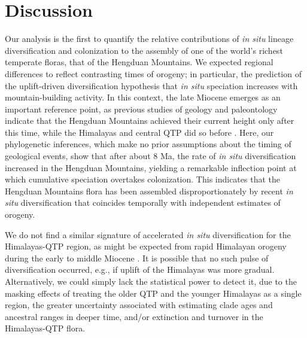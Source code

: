 \documentclass[9pt,twocolumn,twoside,lineno]{pnas-new}
\begin{document}
\section*{Discussion}

Our analysis is the first to quantify the relative contributions of
\textit{in situ} lineage diversification and colonization to the
assembly of one of the world's richest temperate floras, that of the
Hengduan Mountains. We expected regional differences to reflect
contrasting times of orogeny; in particular, the prediction of the
uplift-driven diversification hypothesis that \textit{in situ}
speciation increases with mountain-building activity. In this context,
the late Miocene emerges as an important reference point, as previous
studies of geology and paleontology indicate that the Hengduan
Mountains achieved their current height only after this time, while
the Himalayas and central QTP did so before
\citep{WangY2012,Wang2014,Spicer2003,Favre2015,Renner2016}. Here, our
phylogenetic inferences, which make no prior assumptions about the
timing of geological events, show that after about 8 Ma, the rate of
\textit{in situ} diversification increased in the Hengduan Mountains,
yielding a remarkable inflection point at which cumulative speciation
overtakes colonization. This indicates that the Hengduan Mountains
flora has been assembled disproportionately by recent \textit{in situ}
diversification that coincides temporally with independent estimates
of orogeny.

We do not find a similar signature of accelerated \textit{in situ}
diversification for the Himalayas-QTP region, as might be expected
from rapid Himalayan orogeny during the early to middle Miocene
\citep{searle2011,Spicer2003,Wang2014}. It is possible that no such
pulse of diversification occurred, e.g., if uplift of the Himalayas
was more gradual. Alternatively, we could simply lack the statistical
power to detect it, due to the masking effects of treating the older
QTP and the younger Himalayas as a single region, the greater
uncertainty associated with estimating clade ages and ancestral ranges
in deeper time, and/or extinction and turnover in the Himalayas-QTP
flora.
\end{document}
